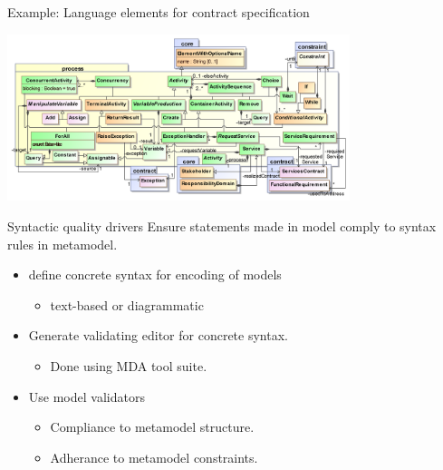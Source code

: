 
\begin{frame}{Example: Language elements for contract specification}

  \includegraphics[width=100mm]{process}

\end{frame}


\begin{frame}{Syntactic quality drivers}
  Ensure statements made in model comply to syntax rules in metamodel.
  \pause
  \begin{itemize}
    \item<+-| alert@+> define concrete syntax for encoding of models
      \begin{itemize}
	\item text-based or diagrammatic
      \end{itemize}
    \item<+-| alert@+> Generate validating editor for concrete syntax.
      \begin{itemize}
	\item Done using MDA tool suite.
      \end{itemize}
    \item<+-| alert@+> Use model validators
      \begin{itemize}
	\item Compliance to metamodel structure.
	\item Adherance to metamodel constraints.
      \end{itemize}
  \end{itemize}
\end{frame}


